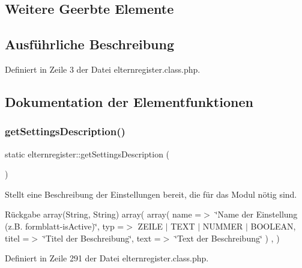 \subsection*{Weitere Geerbte Elemente}


\subsection{Ausführliche Beschreibung}


Definiert in Zeile 3 der Datei elternregister.\+class.\+php.



\subsection{Dokumentation der Elementfunktionen}
\mbox{\label{classelternregister_a576687d2b88e2827b8d3fe12db9a6eb4}} 
\subsubsection{\texorpdfstring{get\+Settings\+Description()}{getSettingsDescription()}}
{\footnotesize\ttfamily static elternregister\+::get\+Settings\+Description (\begin{DoxyParamCaption}{ }\end{DoxyParamCaption})\hspace{0.3cm}{\ttfamily [static]}}

Stellt eine Beschreibung der Einstellungen bereit, die für das Modul nötig sind. \begin{DoxyReturn}{Rückgabe}
array(\+String, String) array( array( \textquotesingle{}name\textquotesingle{} =$>$ \char`\"{}\+Name der Einstellung (z.\+B. formblatt-\/is\+Active)\char`\"{}, \textquotesingle{}typ\textquotesingle{} =$>$ Z\+E\+I\+LE $\vert$ T\+E\+XT $\vert$ N\+U\+M\+M\+ER $\vert$ B\+O\+O\+L\+E\+AN, \textquotesingle{}titel\textquotesingle{} =$>$ \char`\"{}\+Titel der Beschreibung\char`\"{}, \textquotesingle{}text\textquotesingle{} =$>$ \char`\"{}\+Text der Beschreibung\char`\"{} ) , ) 
\end{DoxyReturn}


Definiert in Zeile 291 der Datei elternregister.\+class.\+php.

\mbox{\label{classelternregister_a3e4fdad46bff91acbe57ff27d9acc3d9}} 
